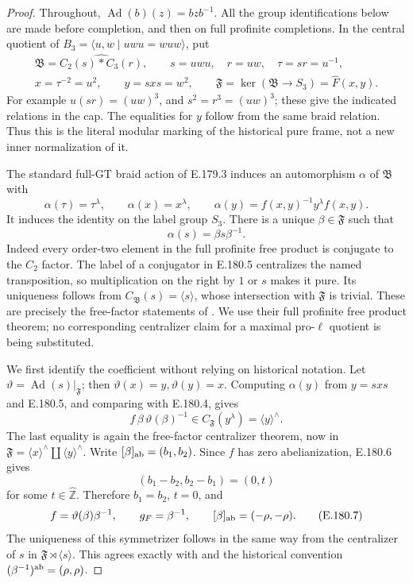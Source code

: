 \begin{proof}
Throughout, \(\operatorname{Ad}(b)(z)=bzb^{-1}\).
All the group identifications below are made before
completion, and then on full profinite completions.
In the central quotient of
\(B_3=\langle u,w\mid uwu=wuw\rangle\), put
\[
 \begin{gathered}
 \mathfrak B=\widehat{C_2(s)*C_3(r)},\qquad
 s=uwu,\quad r=uw,\quad \tau=sr=u^{-1},\\
 x=\tau^{-2}=u^2,\qquad y=sxs=w^2,\qquad
 \mathfrak F=\ker(\mathfrak B\longrightarrow S_3)
                =\widehat F(x,y).
 \end{gathered}
\tag{E.180.3}
\]
For example \(u(sr)=(uw)^3\), and \(s^2=r^3=(uw)^3\);
these give the indicated relations in the cap.
The equalities for \(y\) follow from the same braid
relation.  Thus this is the literal modular marking
of the historical pure frame, not a new inner
normalization of it.

The standard full-GT braid action of E.179.3 induces
an automorphism \(\alpha\) of \(\mathfrak B\) with
\[
 \alpha(\tau)=\tau^\lambda,\qquad
 \alpha(x)=x^\lambda,\qquad
 \alpha(y)=f(x,y)^{-1}y^\lambda f(x,y).
\tag{E.180.4}
\]
It induces the identity on the label group \(S_3\).
There is a unique \(\beta\in\mathfrak F\) such that
\[
                         \alpha(s)=\beta s\beta^{-1}.
\tag{E.180.5}
\]
Indeed every order-two element in the full profinite
free product is conjugate to the \(C_2\) factor.
The label of a conjugator in E.180.5 centralizes the
named transposition, so multiplication on the right
by \(1\) or \(s\) makes it pure.  Its uniqueness
follows from
\(C_{\mathfrak B}(s)=\langle s\rangle\), whose
intersection with \(\mathfrak F\) is trivial.
These are precisely the free-factor statements of
\citet[Theorems A and B, p.155; proofs,
pp.157--160]{SymHerfortRibes1985}.
We use their full profinite free product theorem;
no corresponding centralizer claim for a maximal
pro-\(\ell\) quotient is being substituted.

We first identify the coefficient without relying
on historical notation.  Let
\(\vartheta=\operatorname{Ad}(s)|_{\mathfrak F}\);
then \(\vartheta(x)=y,\vartheta(y)=x\).
Computing \(\alpha(y)\) from \(y=sxs\) and
E.180.5, and comparing with E.180.4, gives
\[
              f\,\beta\,\vartheta(\beta)^{-1}
                          \in C_{\mathfrak F}(y^\lambda)
                           =\langle y\rangle^\wedge .
\tag{E.180.6}
\]
The last equality is again the free-factor centralizer
theorem, now in
\(\mathfrak F=\langle x\rangle^\wedge
 \amalg\langle y\rangle^\wedge\).
Write \([\beta]_{\rm ab}=(b_1,b_2)\).
Since \(f\) has zero abelianization, E.180.6 gives
\[
                  (b_1-b_2,b_2-b_1)=(0,t)
\]
for some \(t\in\widehat{\mathbb Z}\).  Therefore
\(b_1=b_2\), \(t=0\), and
\[
 f=\vartheta(\beta)\beta^{-1},\qquad
 g_F=\beta^{-1},\qquad
 [\beta]_{\rm ab}=(-\rho,-\rho).
\tag{E.180.7}
\]
The uniqueness of this symmetrizer follows in the
same way from the centralizer of \(s\) in
\(\mathfrak F\rtimes\langle s\rangle\).
This agrees exactly with
\citet[Definition 5.1, author p.17]
{SymNakamuraSchneps2000} and the historical convention
\((\beta^{-1})^{\rm ab}=(\rho,\rho)\).


\end{proof}
